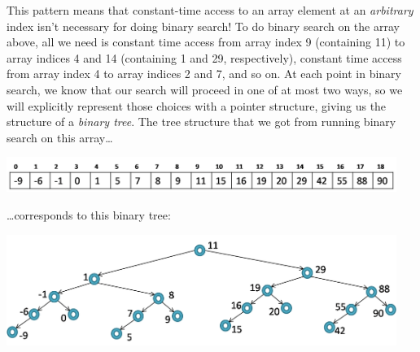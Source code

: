 This pattern means that constant-time access to an array element at an
\emph{arbitrary} index isn't necessary for doing binary search! To do
binary search on the array above, all we need is constant time access
from array index 9 (containing 11) to array indices 4 and 14
(containing 1 and 29, respectively), constant time access from array
index 4 to array indices 2 and 7, and so on. At each point in binary
search, we know that our search will proceed in one of at most two
ways, so we will explicitly represent those choices with a pointer
structure, giving us the structure of a \emph{binary tree}. The tree
structure that we got from running binary search on this array\ldots
\begin{center}
  \includegraphics[width=0.95\textwidth]{img/abstract-bst2.png}
\end{center}
\ldots corresponds to this binary tree:
\begin{center}
  \includegraphics[width=0.95\textwidth]{img/abstract-bst3.png}
\end{center}





